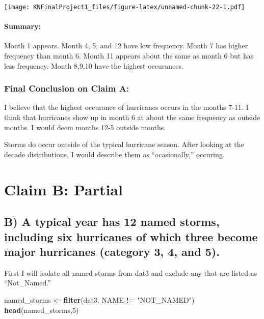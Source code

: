 \documentclass[
]{article}
\newenvironment{Shaded}{\begin{snugshade}}{\end{snugshade}}
\newcommand{\DecValTok}[1]{\textcolor[rgb]{0.00,0.00,0.81}{#1}}
\newcommand{\KeywordTok}[1]{\textcolor[rgb]{0.13,0.29,0.53}{\textbf{#1}}}
\newcommand{\NormalTok}[1]{#1}
\newcommand{\OperatorTok}[1]{\textcolor[rgb]{0.81,0.36,0.00}{\textbf{#1}}}
\newcommand{\StringTok}[1]{\textcolor[rgb]{0.31,0.60,0.02}{#1}}
\begin{document}
\texttt{[image: KNFinalProject1\_files/figure-latex/unnamed-chunk-22-1.pdf]}

\hypertarget{summary-4}{%
\paragraph{Summary:}\label{summary-4}}

Month 1 appears. Month 4, 5, and 12 have low frequency. Month 7 has
higher frequency than month 6. Month 11 appears about the same as month
6 but has less frequency. Month 8,9,10 have the highest occurances.

\hypertarget{final-conclusion-on-claim-a}{%
\subsubsection{Final Conclusion on Claim
A:}\label{final-conclusion-on-claim-a}}

I believe that the highest occurance of hurricanes occurs in the months
7-11. I think that hurricanes show up in month 6 at about the same
frequency as outside months. I would deem months 12-5 outside months.

Storms do occur outside of the typical hurricane season. After looking
at the decade distributions, I would describe them as ``ocasionally,''
occuring.

\hypertarget{claim-b-partial}{%
\section{Claim B: Partial}\label{claim-b-partial}}

\hypertarget{b-a-typical-year-has-12-named-storms-including-six-hurricanes-of-which-three-become-major-hurricanes-category-3-4-and-5.}{%
\subsection{B) A typical year has 12 named storms, including six
hurricanes of which three become major hurricanes (category 3, 4, and
5).}\label{b-a-typical-year-has-12-named-storms-including-six-hurricanes-of-which-three-become-major-hurricanes-category-3-4-and-5.}}

First I will isolate all named storms from dat3 and exclude any that are
listed as ``Not\_Named.''

\begin{Shaded}
\begin{Highlighting}[]
\NormalTok{named_storms <-}\StringTok{ }\KeywordTok{filter}\NormalTok{(dat3, NAME }\OperatorTok{!=}\StringTok{ "NOT_NAMED"}\NormalTok{)}
\KeywordTok{head}\NormalTok{(named_storms,}\DecValTok{5}\NormalTok{)}
\end{Highlighting}
\end{Shaded}
\end{document}
